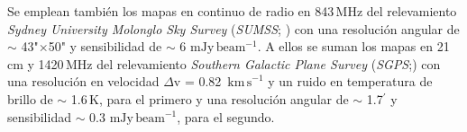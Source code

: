 \documentclass[baaa]{baaa}
\begin{document}
Se emplean tambi\'en los mapas en continuo de radio en 843\,MHz del relevamiento {\it Sydney University Molonglo Sky Survey} (\emph{SUMSS};  \citealt{Sadler2001}) con una resoluci\'on angular de $\sim$ 43"$\times$50" y sensibilidad de $\sim$ 6 $\mathrm{mJy\,beam^{-1}}$. A ellos se suman los mapas en  21\,cm y 1420\,MHz del relevamiento {\it Southern Galactic Plane Survey} (\emph{SGPS};\citealt{MCG2005}) con una resoluci\'on en velocidad $\Delta$v = 0.82~$\mathrm{km\,s}^{-1}$ y un ruido en temperatura de brillo de $\sim$ 1.6\,K, para el primero y una resoluci\'on angular de $\sim$ 1.7$^{\prime}$ y sensibilidad $\sim$ 0.3 $\mathrm{mJy\,beam^{-1}}$, para el segundo. 





\end{document}
